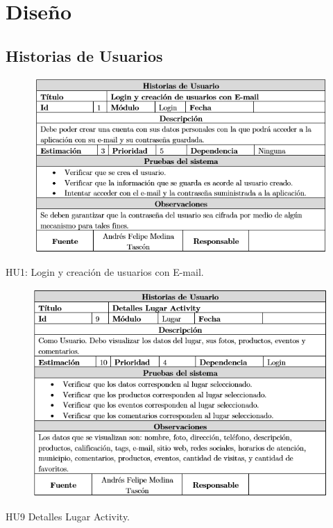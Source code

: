 \documentclass[12pt,letterpaper,openany]{book}
\begin{document}
\section{Diseño}
\subsection{Historias de Usuarios}
\begin{table}[H]
\begin{center}
\begin{figure}[H]
\begin{center}
\includegraphics[width=13cm]{./imagenes/HU/HU1}
\end{center}
\end{figure}
\end{center}
\caption{HU1: Login y creación de usuarios con E-mail.}
\end{table}

\begin{table}[H]
\begin{center}
\begin{figure}[H]
\begin{center}
\includegraphics[width=13cm]{./imagenes/HU/HU9}
\end{center}
\end{figure}
\end{center}
\caption{HU9 Detalles Lugar Activity.}
\end{table}
\end{document}
